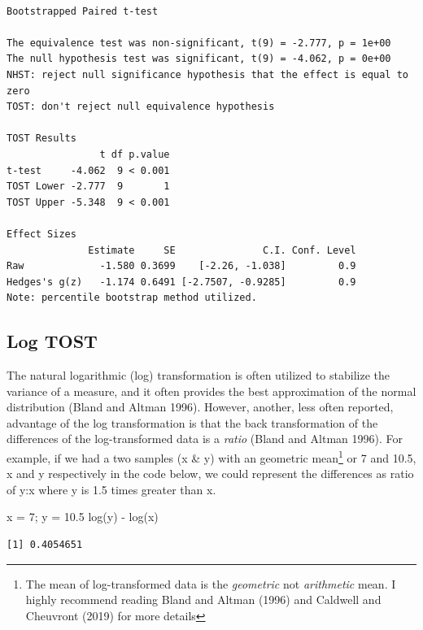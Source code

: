 \documentclass[
]{interact}
\newenvironment{Shaded}{\begin{snugshade}}{\end{snugshade}}
\newcommand{\DecValTok}[1]{\textcolor[rgb]{0.68,0.00,0.00}{#1}}
\newcommand{\FloatTok}[1]{\textcolor[rgb]{0.68,0.00,0.00}{#1}}
\newcommand{\FunctionTok}[1]{\textcolor[rgb]{0.28,0.35,0.67}{#1}}
\newcommand{\NormalTok}[1]{\textcolor[rgb]{0.00,0.23,0.31}{#1}}
\newcommand{\OtherTok}[1]{\textcolor[rgb]{0.00,0.23,0.31}{#1}}
\newcommand{\SpecialCharTok}[1]{\textcolor[rgb]{0.37,0.37,0.37}{#1}}
\begin{document}
\begin{verbatim}

Bootstrapped Paired t-test

The equivalence test was non-significant, t(9) = -2.777, p = 1e+00
The null hypothesis test was significant, t(9) = -4.062, p = 0e+00
NHST: reject null significance hypothesis that the effect is equal to zero 
TOST: don't reject null equivalence hypothesis

TOST Results 
                t df p.value
t-test     -4.062  9 < 0.001
TOST Lower -2.777  9       1
TOST Upper -5.348  9 < 0.001

Effect Sizes 
              Estimate     SE               C.I. Conf. Level
Raw             -1.580 0.3699    [-2.26, -1.038]         0.9
Hedges's g(z)   -1.174 0.6491 [-2.7507, -0.9285]         0.9
Note: percentile bootstrap method utilized.
\end{verbatim}

\newpage

\hypertarget{log-tost}{%
\subsection{Log TOST}\label{log-tost}}

The natural logarithmic (log) transformation is often utilized to
stabilize the variance of a measure, and it often provides the best
approximation of the normal distribution (Bland and Altman 1996).
However, another, less often reported, advantage of the log
transformation is that the back transformation of the differences of the
log-transformed data is a \emph{ratio} (Bland and Altman 1996). For
example, if we had a two samples (x \& y) with an geometric
mean\footnote{The mean of log-transformed data is the \emph{geometric}
  not \emph{arithmetic} mean. I highly recommend reading Bland and
  Altman (1996) and Caldwell and Cheuvront (2019) for more details} or 7
and 10.5, x and y respectively in the code below, we could represent the
differences as ratio of y:x where y is 1.5 times greater than x.

\begin{Shaded}
\begin{Highlighting}[]
\NormalTok{x }\OtherTok{=} \DecValTok{7}\NormalTok{; y }\OtherTok{=} \FloatTok{10.5}
\FunctionTok{log}\NormalTok{(y) }\SpecialCharTok{{-}} \FunctionTok{log}\NormalTok{(x)}
\end{Highlighting}
\end{Shaded}

\begin{verbatim}
[1] 0.4054651
\end{verbatim}
\end{document}
